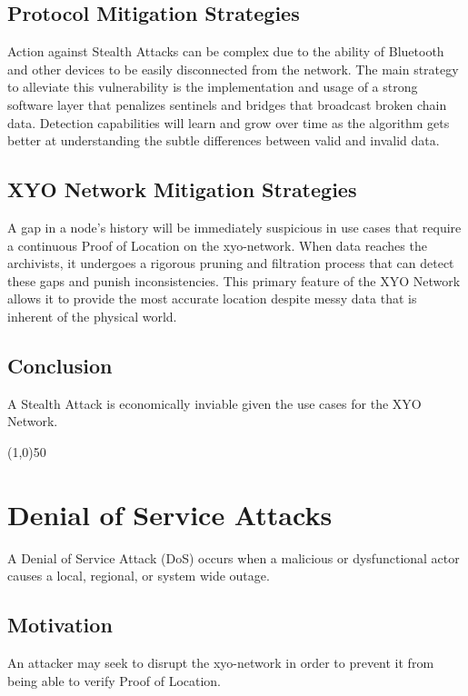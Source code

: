 \documentclass{article}
\begin{document}
\subsection{Protocol Mitigation Strategies}
Action against Stealth Attacks can be complex due to the ability of Bluetooth and other devices to be easily disconnected from the network. The main strategy to alleviate this vulnerability is the implementation and usage of a strong software layer that penalizes \Glspl{sentinel} and \Glspl{bridge} that broadcast broken chain data. Detection capabilities will learn and grow over time as the algorithm gets better at understanding the subtle differences between valid and invalid data.

\subsection{XYO Network Mitigation Strategies}
A gap in a node's history will be immediately suspicious in use cases that require a continuous Proof of Location on the \Gls{xyo-network}. When data reaches the \Glspl{archivist}, it undergoes a rigorous pruning and filtration process that can detect these gaps and punish inconsistencies. This primary feature of the XYO Network allows it to provide the most accurate location despite messy data that is inherent of the physical world. 

\subsection{Conclusion}
A Stealth Attack is economically inviable given the use cases for the XYO Network.

\begin{center}
\line(1,0){50}
\end{center}

\section{Denial of Service Attacks}
A Denial of Service Attack (DoS) occurs when a malicious or dysfunctional actor causes a local, regional, or system wide outage. 

\subsection{Motivation}

An attacker may seek to disrupt the \Gls{xyo-network} in order to prevent it from being able to verify Proof of Location.
\end{document}
